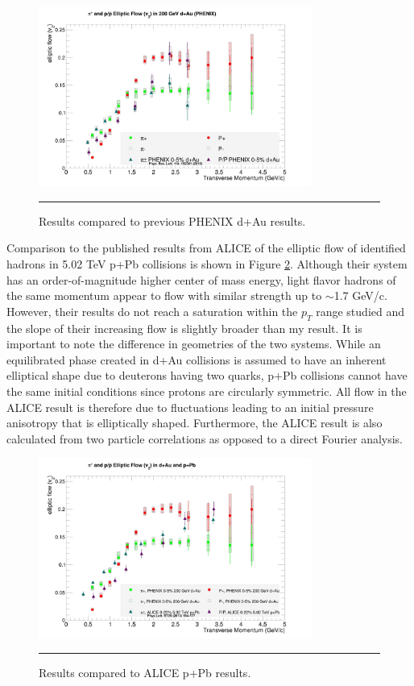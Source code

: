 \begin{figure}[hbtp]
\centering    
    \includegraphics[width=0.8\textwidth]{results/v2allvsshengli.jpg}
    \rule{35em}{0.5pt}
    \caption[Results compared to previous PHENIX d+Au results.]{Results compared to previous PHENIX d+Au results. \citep{Adare:2014keg}}
    \label{fig:v2allvsshengli}
\end{figure}
Comparison to the published results from ALICE of the elliptic flow of identified hadrons in 5.02 TeV p+Pb collisions is shown in Figure \ref{fig:v2allvsalice}. Although their system has an order-of-magnitude higher center of mass energy, light flavor hadrons of the same momentum appear to flow with similar strength up to $\sim$1.7 GeV/c. However, their results do not reach a saturation within the $p_T$ range studied and the slope of their increasing flow is slightly broader than my result. It is important to note the difference in geometries of the two systems. While an equilibrated phase created in d+Au collisions is assumed to have an inherent elliptical shape due to deuterons having two quarks, p+Pb collisions cannot have the same initial conditions since protons are circularly symmetric. All flow in the ALICE result is therefore due to fluctuations leading to an initial pressure anisotropy that is elliptically shaped. Furthermore, the ALICE result is also calculated from two particle correlations as opposed to a direct Fourier analysis. 

\begin{figure}[hbtp]
\centering    
    \includegraphics[width=0.8\textwidth]{results/v2allvsalice.jpg}
    \rule{35em}{0.5pt}
    \caption[Results compared to ALICE p+Pb results.]{Results compared to ALICE p+Pb results. \citep{ABELEV:2013wsa}}
    \label{fig:v2allvsalice}
\end{figure}

